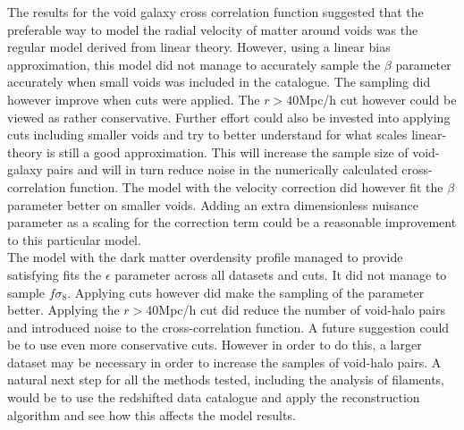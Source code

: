 The results for the void galaxy cross correlation function suggested that the preferable way to model the radial velocity of matter around voids was the regular model derived from linear theory. However, using a linear bias approximation, this model did not manage to accurately sample the $\beta$ parameter accurately when small voids was included in the catalogue. The sampling did however improve when cuts were applied. The $r>40$Mpc/h cut however could be viewed as rather conservative. Further effort could also be invested into applying cuts including smaller voids and try to better understand for what scales linear-theory is still a good approximation. This will increase the sample size of void-galaxy pairs and will in turn reduce noise in the numerically calculated cross-correlation function. The model with the velocity correction did however fit the $\beta$ parameter better on smaller voids. Adding an extra dimensionless nuisance parameter as a scaling for the correction term could be a reasonable improvement to this particular model.\\\indent
The model with the dark matter overdensity profile managed to provide satisfying fits the $\epsilon$ parameter across all datasets and cuts. It did not manage to sample $f\sigma_8$. Applying cuts however did make the sampling of the parameter better. Applying the $r>40$Mpc/h cut did reduce the number of void-halo pairs and introduced noise to the cross-correlation function. A future suggestion could be to use even more conservative cuts. However in order to do this, a larger dataset may be necessary in order to increase the samples of void-halo pairs. A natural next step for all the methods tested, including the analysis of filaments, would be to use the redshifted data catalogue and apply the reconstruction algorithm and see how this affects the model results.